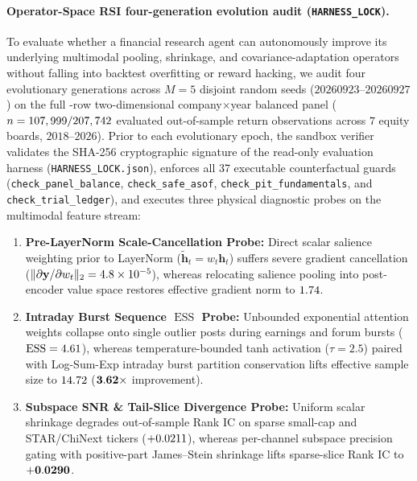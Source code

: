 \paragraph{Operator-Space RSI four-generation evolution audit (\texttt{HARNESS\_LOCK}).}
To evaluate whether a financial research agent can autonomously improve its underlying multimodal
pooling, shrinkage, and covariance-adaptation operators without falling into backtest overfitting
or reward hacking, we audit four evolutionary generations across $M=5$ disjoint random seeds
($20260923\text{--}20260927$) on the full \PanelBalancedRows{}-row two-dimensional
company$\times$year balanced panel ($n = 107,999{} / 207,742{}$ evaluated
out-of-sample return observations across $7$ equity boards, $2018\text{--}2026$). Prior to each
evolutionary epoch, the sandbox verifier validates the SHA-256 cryptographic signature of the
read-only evaluation harness (\texttt{HARNESS\_LOCK.json}), enforces all 37 executable
counterfactual guards (\texttt{check\_panel\_\allowbreak balance}, \texttt{check\_safe\_\allowbreak asof},
\texttt{check\_pit\_\allowbreak fundamentals}, and \texttt{check\_trial\_\allowbreak ledger}), and executes three
physical diagnostic probes on the multimodal feature stream:
\begin{enumerate}
\item \textbf{Pre-LayerNorm Scale-Cancellation Probe:} Direct scalar salience weighting prior to
LayerNorm ($\tilde{\mathbf{h}}_t = w_t \mathbf{h}_t$) suffers severe gradient cancellation
($\|\partial \mathbf{y}/\partial w_t\|_2 = 4.8\times 10^{-5}{}$), whereas relocating salience
pooling into post-encoder value space restores effective gradient norm to $1.74{}$.
\item \textbf{Intraday Burst Sequence $\operatorname{ESS}$ Probe:} Unbounded exponential attention
weights collapse onto single outlier posts during earnings and forum bursts
($\operatorname{ESS} = 4.61{}$), whereas temperature-bounded tanh activation
($\tau = 2.5$) paired with Log-Sum-Exp intraday burst partition conservation lifts effective
sample size to $14.72{}$ ($\mathbf{3.62{}\times}$ improvement).
\item \textbf{Subspace SNR \& Tail-Slice Divergence Probe:} Uniform scalar shrinkage degrades
out-of-sample Rank IC on sparse small-cap and STAR/ChiNext tickers ($+0.0211{}$),
whereas per-channel subspace precision gating with positive-part James--Stein shrinkage
\cite{james1961estimation} lifts sparse-slice Rank IC to $\mathbf{+0.0290{}}$.
\end{enumerate}

